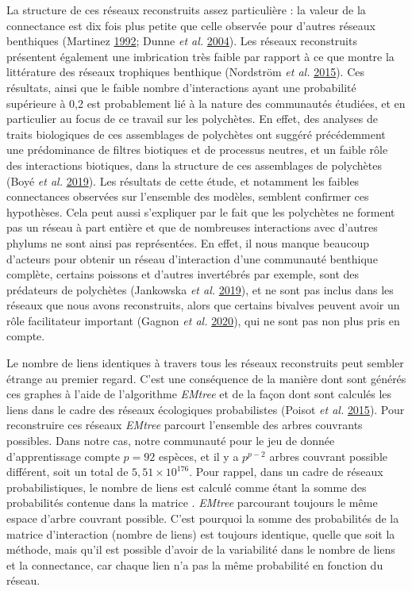\documentclass[12pt,]{article}
\begin{document}
La structure de ces réseaux reconstruits assez particulière : la valeur
de la connectance est dix fois plus petite que celle observée pour
d'autres réseaux benthiques (Martinez
\protect\hyperlink{ref-Martinez_1992}{1992}; Dunne \emph{et al.}
\protect\hyperlink{ref-Dunne_2004}{2004}). Les réseaux reconstruits
présentent également une imbrication très faible par rapport à ce que
montre la littérature des réseaux trophiques benthique (Nordström
\emph{et al.} \protect\hyperlink{ref-Nordstrom_2015}{2015}). Ces
résultats, ainsi que le faible nombre d'interactions ayant une
probabilité supérieure à 0,2 est probablement lié à la nature des
communautés étudiées, et en particulier au focus de ce travail sur les
polychètes. En effet, des analyses de traits biologiques de ces
assemblages de polychètes ont suggéré précédemment une prédominance de
filtres biotiques et de processus neutres, et un faible rôle des
interactions biotiques, dans la structure de ces assemblages de
polychètes (Boyé \emph{et al.}
\protect\hyperlink{ref-Boye_2019a}{2019}). Les résultats de cette étude,
et notamment les faibles connectances observées sur l'ensemble des
modèles, semblent confirmer ces hypothèses. Cela peut aussi s'expliquer
par le fait que les polychètes ne forment pas un réseau à part entière
et que de nombreuses interactions avec d'autres phylums ne sont ainsi
pas représentées. En effet, il nous manque beaucoup d'acteurs pour
obtenir un réseau d'interaction d'une communauté benthique complète,
certains poissons et d'autres invertébrés par exemple, sont des
prédateurs de polychètes (Jankowska \emph{et al.}
\protect\hyperlink{ref-Jankowska_2019}{2019}), et ne sont pas inclus
dans les réseaux que nous avons reconstruits, alors que certains
bivalves peuvent avoir un rôle facilitateur important (Gagnon \emph{et
al.} \protect\hyperlink{ref-Gagnon_2020}{2020}), qui ne sont pas non
plus pris en compte.

Le nombre de liens identiques à travers tous les réseaux reconstruits
peut sembler étrange au premier regard. C'est une conséquence de la
manière dont sont générés ces graphes à l'aide de l'algorithme
\emph{EMtree} et de la façon dont sont calculés les liens dans le cadre
des réseaux écologiques probabilistes (Poisot \emph{et al.}
\protect\hyperlink{ref-Poisot_2015}{2015}). Pour reconstruire ces
réseaux \emph{EMtree} parcourt l'ensemble des arbres couvrants
possibles. Dans notre cas, notre communauté pour le jeu de donnée
d'apprentissage compte \(p = 92\) espèces, et il y a \(p^{p-2}\) arbres
couvrant possible différent, soit un total de \(5,51\times 10^{176}\).
Pour rappel, dans un cadre de réseaux probabilistiques, le nombre de
liens est calculé comme étant la somme des probabilités contenue dans la
matrice . \emph{EMtree} parcourant toujours le même espace d'arbre
couvrant possible. C'est pourquoi la somme des probabilités de la
matrice d'interaction (nombre de liens) est toujours identique, quelle
que soit la méthode, mais qu'il est possible d'avoir de la variabilité
dans le nombre de liens et la connectance, car chaque lien n'a pas la
même probabilité en fonction du réseau.
\end{document}
